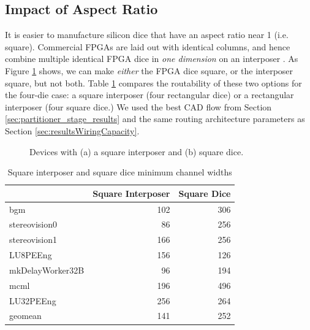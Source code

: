 \documentclass[journal]{IEEEtran}
\begin{document}
\subsection{Impact of Aspect Ratio}
\label{aspect_ratio_impact}
It is easier to manufacture silicon dice that have an aspect ratio near 1 (i.e. square). Commercial FPGAs are laid out with identical columns, and hence combine multiple identical FPGA dice in \textit{one dimension} on an interposer \cite{xilinxTSV}. As Figure \ref{fig:square_tall} shows, we can make \textit{either} the FPGA dice square, or the interposer square, but not both. Table \ref{table:squares} compares the routability of these two options for the four-die case: a square interposer (four rectangular dice) or a rectangular interposer (four square dice.) We used the best CAD flow from Section \ref{sec:partitioner_stage_results} and the same routing architecture parameters as Section \ref{sec:resultsWiringCapacity}. 

\begin{figure}[!htbp]
\centering
{}
\caption{Devices with (a) a square interposer and (b) square dice.}
\label{fig:square_tall}
\end{figure}

\begin{table}[!htbp]
\centering
\caption{Square interposer and square dice minimum channel widths}
\begin{tabular}{|l|r|r|}
\hline
 & Square Interposer & Square Dice \\ \hline \hline
bgm & 102 & 306 \\ \hline
stereovision0 & 86 & 256 \\ \hline
stereovision1 & 166 & 256 \\ \hline
LU8PEEng & 156 & 126 \\ \hline
mkDelayWorker32B & 96 & 194 \\ \hline
mcml & 196 & 496 \\ \hline
LU32PEEng & 256 & 264 \\ \hhline{|=|=|=|}
geomean & 141 & 252 \\ \hline
\end{tabular}
\label{table:squares}
\end{table}
\end{document}
